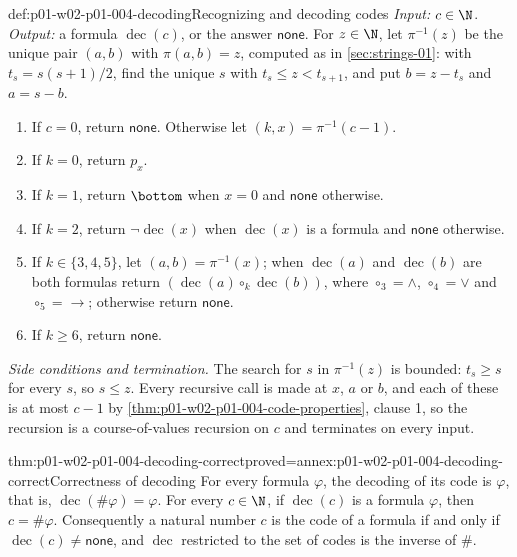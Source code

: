 \begin{hbmethod}{def:p01-w02-p01-004-decoding}{Recognizing and decoding codes}
\emph{Input:} \(c\in\N\). \emph{Output:} a formula \(\operatorname{dec}(c)\),
or the answer \(\mathsf{none}\). For \(z\in\N\), let \(\pi^{-1}(z)\) be the
unique pair \((a,b)\) with \(\pi(a,b)=z\), computed as in
\cref{sec:strings-01}: with \(t_s=s(s+1)/2\), find the unique \(s\) with
\(t_s\le z<t_{s+1}\), and put \(b=z-t_s\) and \(a=s-b\).
\begin{enumerate}
  \item If \(c=0\), return \(\mathsf{none}\). Otherwise let
        \((k,x)=\pi^{-1}(c-1)\).
  \item If \(k=0\), return \(p_x\).
  \item If \(k=1\), return \(\bottom\) when \(x=0\) and \(\mathsf{none}\)
        otherwise.
  \item If \(k=2\), return \(\neg\operatorname{dec}(x)\) when
        \(\operatorname{dec}(x)\) is a formula and \(\mathsf{none}\)
        otherwise.
  \item If \(k\in\{3,4,5\}\), let \((a,b)=\pi^{-1}(x)\); when
        \(\operatorname{dec}(a)\) and \(\operatorname{dec}(b)\) are both
        formulas return \((\operatorname{dec}(a)\circ_k\operatorname{dec}(b))\),
        where \(\circ_3={\land}\), \(\circ_4={\lor}\) and \(\circ_5={\to}\);
        otherwise return \(\mathsf{none}\).
  \item If \(k\ge6\), return \(\mathsf{none}\).
\end{enumerate}
\emph{Side conditions and termination.} The search for \(s\) in
\(\pi^{-1}(z)\) is bounded: \(t_s\ge s\) for every \(s\), so \(s\le z\). Every
recursive call is made at \(x\), \(a\) or \(b\), and each of these is at most
\(c-1\) by \cref{thm:p01-w02-p01-004-code-properties}, clause 1, so the
recursion is a course-of-values recursion on \(c\) and terminates on every
input.
\end{hbmethod}

\begin{hbtheorem}{thm:p01-w02-p01-004-decoding-correct}{proved=annex:p01-w02-p01-004-decoding-correct}{Correctness of decoding}
For every formula \(\varphi\), the decoding of its code is \(\varphi\), that
is, \(\operatorname{dec}(\#\varphi)=\varphi\). For every \(c\in\N\), if \(\operatorname{dec}(c)\) is a formula \(\varphi\), then
\(c=\#\varphi\). Consequently a natural number \(c\) is the code of a formula
if and only if \(\operatorname{dec}(c)\ne\mathsf{none}\), and
\(\operatorname{dec}\) restricted to the set of codes is the inverse of
\(\#\).
\end{hbtheorem}

